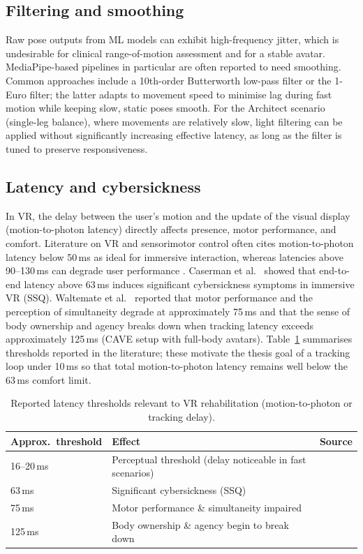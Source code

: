 \subsection{Filtering and smoothing}

Raw pose outputs from ML models can exhibit high-frequency jitter, which is undesirable for clinical range-of-motion assessment and for a stable avatar. MediaPipe-based pipelines in particular are often reported to need smoothing. Common approaches include a 10th-order Butterworth low-pass filter or the 1-Euro filter; the latter adapts to movement speed to minimise lag during fast motion while keeping slow, static poses smooth. For the Architect scenario (single-leg balance), where movements are relatively slow, light filtering can be applied without significantly increasing effective latency, as long as the filter is tuned to preserve responsiveness.

\subsection{Latency and cybersickness}

In VR, the delay between the user's motion and the update of the visual display (motion-to-photon latency) directly affects presence, motor performance, and comfort. Literature on VR and sensorimotor control often cites motion-to-photon latency below 50\,ms as ideal for immersive interaction, whereas latencies above 90--130\,ms can degrade user performance \cite{caserman2019latency, warburton2023motionphoton, kelkkanen2023latency}. Caserman et al.\ \cite{caserman2019latency} showed that end-to-end latency above 63\,ms induces significant cybersickness symptoms in immersive VR (SSQ). Waltemate et al.\ \cite{waltemate2016impact} reported that motor performance and the perception of simultaneity degrade at approximately 75\,ms and that the sense of body ownership and agency breaks down when tracking latency exceeds approximately 125\,ms (CAVE setup with full-body avatars). Table~\ref{tab:latency-thresholds} summarises thresholds reported in the literature; these motivate the thesis goal of a tracking loop under 10\,ms so that total motion-to-photon latency remains well below the 63\,ms comfort limit.

\begin{table}[htbp]
\centering
\caption{Reported latency thresholds relevant to VR rehabilitation (motion-to-photon or tracking delay).}
\label{tab:latency-thresholds}
\begin{tabularx}{\textwidth}{@{}lXl@{}}
\toprule
Approx.\ threshold & Effect & Source \\
\midrule
16--20\,ms & Perceptual threshold (delay noticeable in fast scenarios) & \cite{ellis2004generalizeability} \\
63\,ms & Significant cybersickness (SSQ) & \cite{caserman2019latency} \\
75\,ms & Motor performance \& simultaneity impaired & \cite{waltemate2016impact} \\
125\,ms & Body ownership \& agency begin to break down & \cite{waltemate2016impact} \\
\bottomrule
\end{tabularx}
\end{table}

